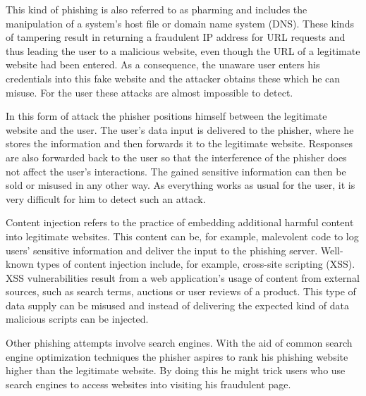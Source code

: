 \begin{description}[leftmargin=0cm]
	\item[DNS Hijacking:] This kind of phishing is also referred to as pharming and includes the manipulation of a system's host file or domain name system (DNS).
 These kinds of tampering result in returning a fraudulent IP address for URL requests and thus leading the user to a malicious website, even though the URL of a legitimate website had been entered.
 As a consequence, the unaware user enters his credentials into this fake website and the attacker obtains these which he can misuse.
 For the user these attacks are almost impossible to detect.

	\item[Man-in-the-Middle Attack:] In this form of attack the phisher positions himself between the legitimate website and the user.
 The user's data input is delivered to the phisher, where he stores the information and then forwards it to the legitimate website.
 Responses are also forwarded back to the user so that the interference of the phisher does not affect the user's interactions.
 The gained sensitive information can then be sold or misused in any other way.
 As everything works as usual for the user, it is very difficult for him to detect such an attack.
 
	\item[Content Injection/XSS:] Content injection refers to the practice of embedding additional harmful content into legitimate websites.
 This content can be, for example, malevolent code to log users' sensitive information and deliver the input to the phishing server.
 Well-known types of content injection include, for example, cross-site scripting (XSS).
XSS vulnerabilities result from a web application's usage of content from external sources, such as search terms, auctions or user reviews of a product.
 This type of data supply can be misused and instead of delivering the expected kind of data malicious scripts can be injected.

	\item[Search Engine Poisoning:] Other phishing attempts involve search engines.
	With the aid of common search engine optimization techniques the phisher aspires to rank his phishing website higher than the legitimate website. By doing this he might trick users who use search engines to access websites into visiting his fraudulent page.
	
\end{description}

